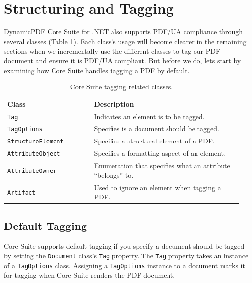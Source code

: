 \documentclass[american]{tufte-book}
\providecommand{\tabularnewline}{\\}
\numberwithin{equation}{section}
\numberwithin{figure}{section}
\begin{document}
{{\begin{marginfigure}
\end{marginfigure}


\section{Structuring and Tagging}

DynamicPDF Core Suite for .NET also supports PDF/UA compliance
through several classes (Table \ref{tab:Core-Suite-tagging}). Each
class's usage will become clearer in the remaining sections when we
incrementally use the different classes to tag our PDF document and
ensure it is PDF/UA compliant. But before we do, lets start by examining
how Core Suite handles tagging a PDF by default.

\begin{table}
\begin{tabular}{p{0.35\linewidth}p{0.6\linewidth}}
\toprule 
{\footnotesize Class} & {\footnotesize Description}\tabularnewline
\midrule
{\footnotesize\texttt{Tag}} & {\footnotesize Indicates an element is to be tagged.}\tabularnewline
{\footnotesize\texttt{TagOptions}} & {\footnotesize Specifies is a document should be tagged.}\tabularnewline
{\footnotesize\texttt{StructureElement}} & {\footnotesize Specifies a structural element of a PDF.}\tabularnewline
{\footnotesize\texttt{AttributeObject}} & {\footnotesize Specifies a formatting aspect of an element.}\tabularnewline
{\footnotesize\texttt{AttributeOwner}} & {\footnotesize Enumeration that specifies what an attribute ``belongs''
to.}\tabularnewline
{\footnotesize\texttt{Artifact}} & {\footnotesize Used to ignore an element when tagging a PDF.}\tabularnewline
\bottomrule
\end{tabular}

\caption{Core Suite tagging related classes.}\label{tab:Core-Suite-tagging}

\end{table}


\subsection{Default Tagging}

Core Suite supports default tagging if you specify a document should
be tagged by setting the \texttt{Document} class's \texttt{Tag} property.
The \texttt{Tag} property takes an instance of a \texttt{TagOptions}
class. Assigning a \texttt{TagOptions} instance to a document marks
it for tagging when Core Suite renders the PDF document.

}}
\end{document}
